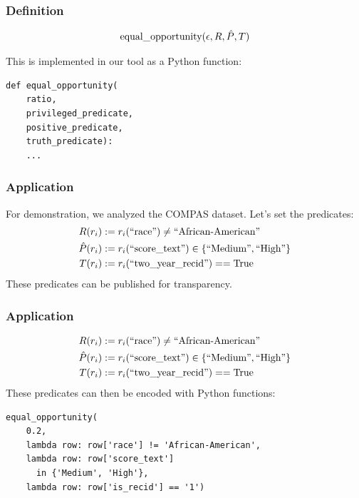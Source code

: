 \documentclass{beamer}
\DeclarePairedDelimiter{\set}{\{}{\}}
\begin{document}
\begin{frame}[fragile]
    \frametitle{Definition}
    \begin{align*}
        \text{equal\_opportunity} (\epsilon, R, \hat{P}, T)
    \end{align*}

    This is implemented in our tool as a Python function:

    \begin{center}
    \begin{minipage}{0.8\textwidth}
    \begin{verbatim}
def equal_opportunity(
    ratio,
    privileged_predicate,
    positive_predicate,
    truth_predicate):
    ...
    \end{verbatim}
    \end{minipage}
    \end{center}
\end{frame}

\begin{frame}
    \frametitle{Application}
    For demonstration, we analyzed the COMPAS dataset.
    Let's set the predicates:
    \begin{align*}
        \priv(r_i) & := r_i(\text{``race''}) \neq \text{``African-American''}\\
        \pos(r_i)  & := r_i(\text{``score\_text''}) \in \set{\text{``Medium''},\text{``High''}}\\
        \tru(r_i)  & := r_i(\text{``two\_year\_recid''}) == \text{True}
    \end{align*}
    These predicates can be published for transparency.
\end{frame}

\begin{frame}[fragile]
    \frametitle{Application}
    \begin{align*}
        \priv(r_i) & := r_i(\text{``race''}) \neq \text{``African-American''}\\
        \pos(r_i)  & := r_i(\text{``score\_text''}) \in \set{\text{``Medium''},\text{``High''}}\\
        \tru(r_i)  & := r_i(\text{``two\_year\_recid''}) == \text{True}
    \end{align*}
    These predicates can then be encoded with Python functions:
    \begin{center}
    \begin{minipage}{0.8\textwidth}
    \begin{verbatim}
equal_opportunity(
    0.2,
    lambda row: row['race'] != 'African-American',
    lambda row: row['score_text']
      in {'Medium', 'High'},
    lambda row: row['is_recid'] == '1')
    \end{verbatim}
    \end{minipage}
    \end{center}
\end{frame}
\end{document}
